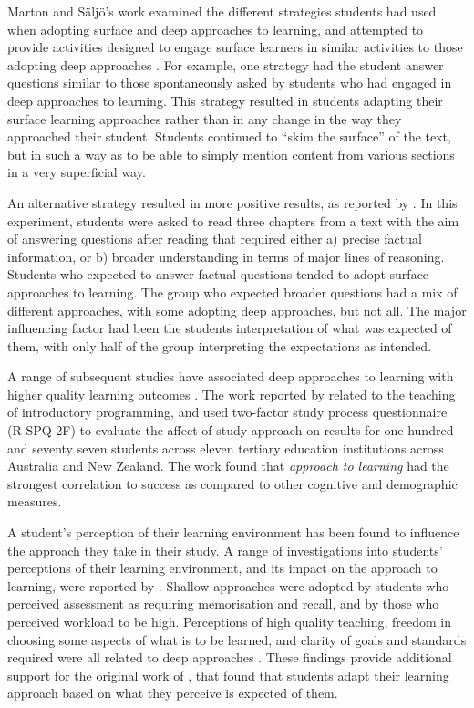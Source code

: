 Marton and S\"{a}lj\"{o}'s work examined the different strategies students had used when adopting surface and deep approaches to learning, and attempted to provide activities designed to engage surface learners in similar activities to those adopting deep approaches \cite{Marton:2005}. For example, one strategy had the student answer questions similar to those spontaneously asked by students who had engaged in deep approaches to learning.  This strategy resulted in students adapting their surface learning approaches rather than in any change in the way they approached their student. Students continued to ``skim the surface'' of the text, but in such a way as to be able to simply mention content from various sections in a very superficial way. 

An alternative strategy resulted in more positive results, as reported by \cite{Marton:1976b}. In this experiment, students were asked to read three chapters from a text with the aim of answering questions after reading that required either a) precise factual information, or b) broader understanding in terms of major lines of reasoning. Students who expected to answer factual questions tended to adopt surface approaches to learning. The group who expected broader questions had a mix of different approaches, with some adopting deep approaches, but not all. The major influencing factor had been the students interpretation of what was expected of them, with only half of the group interpreting the expectations as intended. 


A range of subsequent studies have associated deep approaches to learning with higher quality learning outcomes \cite{Rossum:1984,Prosser:1989,Trigwell:1991,Ramsden:1992,Marton:2005,DeRaadt:2005}. The work reported by \citet{DeRaadt:2005} related to the teaching of introductory programming, and used \citet{Biggs:2001} two-factor study process questionnaire (R-SPQ-2F) to evaluate the affect of study approach on results for one hundred and seventy seven students across eleven tertiary education institutions across Australia and New Zealand. The work found that \emph{approach to learning} had the strongest correlation to success as compared to other cognitive and demographic measures.

A student's perception of their learning environment has been found to influence the approach they take in their study. A range of investigations into students' perceptions of their learning environment, and its impact on the approach to learning, were reported by \citet{Ramsden:1992}. Shallow approaches were adopted by students who perceived assessment as requiring memorisation and recall, and by those who perceived workload to be high. Perceptions of high quality teaching, freedom in choosing some aspects of what is to be learned, and clarity of goals and standards required were all related to deep approaches \cite{Trigwell:1991,Ramsden:1992,Trigwell:1999}. These findings provide additional support for the original work of \cite{Marton:1976b}, that found that students adapt their learning approach based on what they perceive is expected of them.

